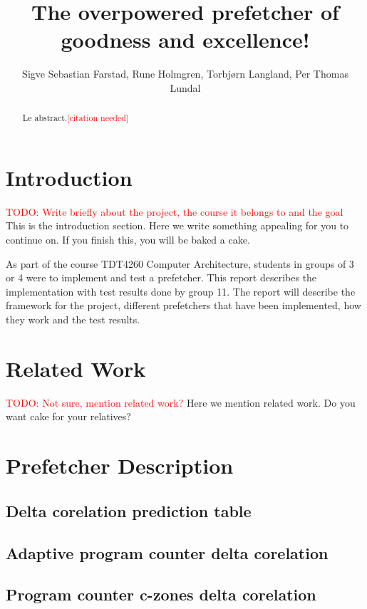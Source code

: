 \documentclass[a4paper]{IEEEtran}
\title{The overpowered prefetcher of goodness and excellence!}
\author{
    Sigve Sebastian Farstad,
    Rune Holmgren,
    Torbjørn Langland,
    Per Thomas Lundal
}
\newcommand\TODO[1]{\textcolor{red}{TODO:#1}}
\newcommand\todo[1]{\TODO{#1}}
\newcommand\cn{\textcolor{red}{[citation needed]}}
\begin{document}
\maketitle

\begin{abstract}
    Le abstract.\cn
\end{abstract}

\section{Introduction}

\todo{ Write briefly about the project, the course it belongs to and the goal}
This is the introduction section.
Here we write something appealing for you to continue on.
If you finish this, you will be baked a cake.

As part of the course TDT4260 Computer Architecture, students in groups of 3 or 4 were to implement and test a prefetcher.
This report describes the implementation with test results done by group 11.
The report will describe the framework for the project, different prefetchers that have been implemented, how they work and the test results.

\section{Related Work}

\todo{ Not sure, mention related work?}
Here we mention related work. Do you want cake for your relatives?

\section{Prefetcher Description}

\subsection{Delta corelation prediction table}

\subsection{Adaptive program counter delta corelation}

\subsection{Program counter c-zones delta corelation}
\end{document}
